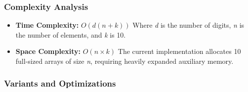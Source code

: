     \subsubsection{Complexity Analysis}
        \begin{itemize}
            \item \textbf{Time Complexity:} $O(d(n + k))$
                \subitem Where \textit{d} is the number of digits, \textit{n} is the number of elements, and \textit{k} is 10.
            \item \textbf{Space Complexity:} $O(n \times k)$ 
                \subitem The current implementation allocates 10 full-sized arrays of size \textit{n}, requiring heavily expanded auxiliary memory.
        \end{itemize}

    \subsubsection{Variants and Optimizations}
